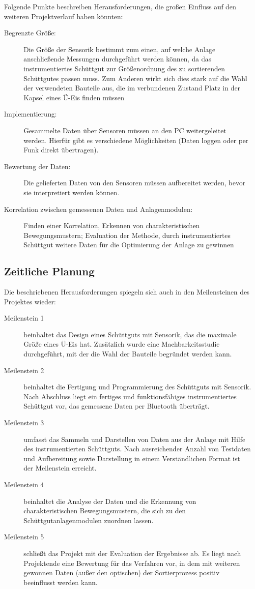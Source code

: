 Folgende Punkte beschreiben Herausforderungen, die großen Einfluss auf den weiteren Projektverlauf haben könnten:
\begin{description}
	\item [Begrenzte Größe:] Die Größe der Sensorik bestimmt zum einen, auf welche Anlage anschließende Messungen durchgeführt werden können, da das instrumentiertes Schüttgut zur Größenordnung des zu sortierenden Schüttgutes passen muss. Zum Anderen wirkt sich dies stark auf die Wahl der verwendeten Bauteile aus, die im verbundenen Zustand Platz in der Kapsel eines Ü-Eis finden müssen
	\item [Implementierung:] Gesammelte Daten über Sensoren müssen an den PC weitergeleitet werden. Hierfür gibt es verschiedene Möglichkeiten (Daten loggen oder per Funk direkt übertragen).
	\item [Bewertung der Daten:] Die gelieferten Daten von den Sensoren müssen aufbereitet werden, bevor sie interpretiert werden können.
	\item [Korrelation zwischen gemessenen Daten und Anlagenmodulen:] Finden einer Korrelation, Erkennen von charakteristischen Bewegungsmustern; Evaluation der Methode, durch instrumentiertes Schüttgut weitere Daten für die Optimierung der Anlage zu gewinnen 
\end{description} 

\subsection{Zeitliche Planung}
Die beschriebenen Herausforderungen spiegeln sich auch in den Meilensteinen des Projektes wieder:
\begin{description}
	\item [Meilenstein 1] beinhaltet das Design eines Schüttguts mit Sensorik, das die maximale Größe eines Ü-Eis hat. Zusätzlich wurde eine Machbarkeitsstudie durchgeführt, mit der die Wahl der Bauteile begründet werden kann.
	\item [Meilenstein 2] beinhaltet die Fertigung und Programmierung des Schüttguts mit Sensorik. Nach Abschluss liegt ein fertiges und funktionsfähiges instrumentiertes Schüttgut vor, das gemessene Daten per Bluetooth überträgt.
	\item [Meilenstein 3] umfasst das Sammeln und Darstellen von Daten aus der Anlage mit Hilfe des instrumentierten Schüttguts. Nach ausreichender Anzahl von Testdaten und Aufbereitung sowie Darstellung in einem Verständlichen Format ist der Meilenstein erreicht.
	\item [Meilenstein 4] beinhaltet die Analyse der Daten und die Erkennung von charakteristischen Bewegungsmustern, die sich zu den Schüttgutanlagenmodulen zuordnen lassen.
	\item [Meilenstein 5] schließt das Projekt mit der Evaluation der Ergebnisse ab. Es liegt nach Projektende eine Bewertung für das Verfahren vor, in dem mit  weiteren gewonnen Daten (außer den optischen) der Sortierprozess positiv beeinflusst werden kann.
\end{description}
	
